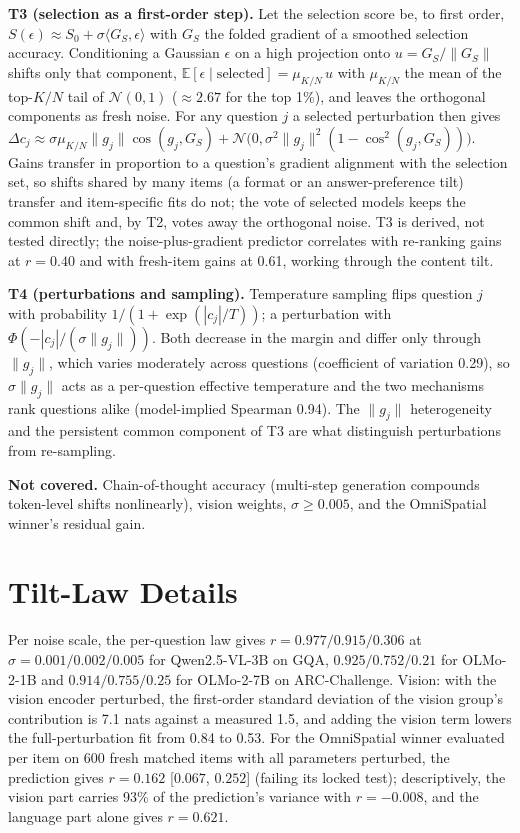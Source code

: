 \documentclass{article}
\begin{document}
\textbf{T3 (selection as a first-order step).} Let the selection score be, to first order, $S(\epsilon) \approx S_0 +
\sigma\langle G_S, \epsilon\rangle$ with $G_S$ the folded gradient of a smoothed selection accuracy. Conditioning a
Gaussian $\epsilon$ on a high projection onto $u = G_S/\|G_S\|$ shifts only that component, $\mathbb{E}[\epsilon \mid
\text{selected}] = \mu_{K/N}\,u$ with $\mu_{K/N}$ the mean of the top-$K/N$ tail of $\mathcal{N}(0,1)$ ($\approx 2.67$
for the top 1\%), and leaves the orthogonal components as fresh noise. For any question $j$ a selected perturbation then
gives $\Delta c_j \approx \sigma\mu_{K/N}\|g_j\|\cos(g_j, G_S) + \mathcal{N}\big(0, \sigma^2\|g_j\|^2(1 - \cos^2(g_j,
G_S))\big)$. Gains transfer in proportion to a question's gradient alignment with the selection set, so shifts shared by
many items (a format or an answer-preference tilt) transfer and item-specific fits do not; the vote of selected models
keeps the common shift and, by T2, votes away the orthogonal noise. T3 is derived, not tested directly; the
noise-plus-gradient predictor correlates with re-ranking gains at $r = 0.40$ and with fresh-item gains at 0.61, working
through the content tilt.

\textbf{T4 (perturbations and sampling).} Temperature sampling flips question $j$ with probability $1/(1 +
\exp(|c_j|/T))$; a perturbation with $\Phi(-|c_j|/(\sigma\|g_j\|))$. Both decrease in the margin and differ only through
$\|g_j\|$, which varies moderately across questions (coefficient of variation 0.29), so $\sigma\|g_j\|$ acts as a
per-question effective temperature and the two mechanisms rank questions alike (model-implied Spearman 0.94). The
$\|g_j\|$ heterogeneity and the persistent common component of T3 are what distinguish perturbations from re-sampling.

\textbf{Not covered.} Chain-of-thought accuracy (multi-step generation compounds token-level shifts nonlinearly), vision
weights, $\sigma \ge 0.005$, and the OmniSpatial winner's residual gain.

\section{Tilt-Law Details}\label{app:tilt}
\begin{center}

\end{center}
Per noise scale, the per-question law gives $r = 0.977 / 0.915 / 0.306$ at $\sigma = 0.001 / 0.002 / 0.005$ for
Qwen2.5-VL-3B on GQA, $0.925 / 0.752 / 0.21$ for OLMo-2-1B and $0.914 / 0.755 / 0.25$ for OLMo-2-7B on ARC-Challenge.
Vision: with the vision encoder perturbed, the first-order standard deviation of the vision group's contribution is 7.1
nats against a measured 1.5, and adding the vision term lowers the full-perturbation fit from 0.84 to 0.53. For the
OmniSpatial winner evaluated per item on 600 fresh matched items with all parameters perturbed, the prediction gives
$r = 0.162$ [$0.067$, $0.252$] (failing its locked test); descriptively, the vision part carries 93\% of the
prediction's variance with $r = -0.008$, and the language part alone gives $r = 0.621$.
\end{document}
